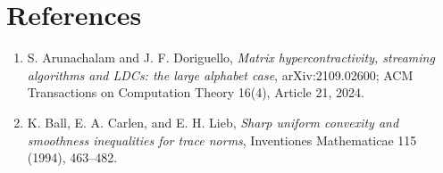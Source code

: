 \documentclass[11pt]{article}
\begin{document}
\section*{References}

\begin{enumerate}
\item S. Arunachalam and J. F. Doriguello,
\emph{Matrix hypercontractivity, streaming algorithms and LDCs: the large
alphabet case}, arXiv:2109.02600; ACM Transactions on Computation Theory
16(4), Article 21, 2024.
\item K. Ball, E. A. Carlen, and E. H. Lieb,
\emph{Sharp uniform convexity and smoothness inequalities for trace norms},
Inventiones Mathematicae 115 (1994), 463--482.
\end{enumerate}
\end{document}
